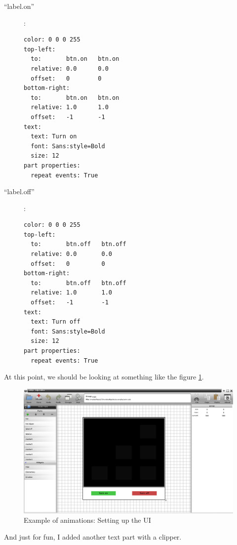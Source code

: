 \documentclass[a4paper]{profusion}
\begin{document}
\begin{description}
\item[``label.on'']:
\begin{verbatim}
color: 0 0 0 255
top-left:
  to:       btn.on   btn.on
  relative: 0.0      0.0
  offset:   0        0
bottom-right:
  to:       btn.on   btn.on
  relative: 1.0      1.0
  offset:   -1       -1
text:
  text: Turn on
  font: Sans:style=Bold
  size: 12
part properties:
  repeat events: True
\end{verbatim}
\item[``label.off'']:
\begin{verbatim}
color: 0 0 0 255
top-left:
  to:       btn.off   btn.off
  relative: 0.0       0.0
  offset:   0         0
bottom-right:
  to:       btn.off   btn.off
  relative: 1.0       1.0
  offset:   -1        -1
text:
  text: Turn off
  font: Sans:style=Bold
  size: 12
part properties:
  repeat events: True
\end{verbatim}
\end{description}

At this point, we should be looking at something like the figure
\ref{fig:anim1_layout}.

\begin{figure}[h!]
  \centering
  \includegraphics[width=1.0\textwidth]{examples/anim1_layout.png}
  \caption{Example of animations: Setting up the UI}
  \label{fig:anim1_layout}
\end{figure}

And just for fun, I added another text part with a clipper.
\end{document}
